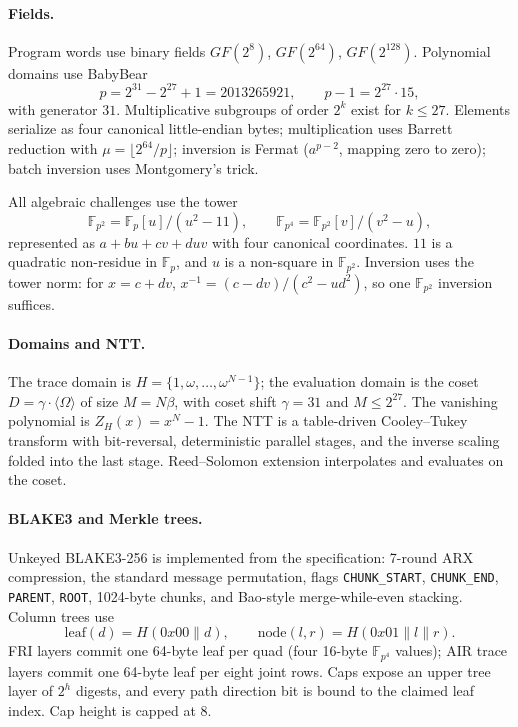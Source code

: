 \documentclass[11pt,a4paper]{article}
\newcommand{\zFp}{\mathbb{F}_p}
\newcommand{\zFpTwo}{\mathbb{F}_{p^2}}
\newcommand{\zFpFour}{\mathbb{F}_{p^4}}
\begin{document}
\paragraph{Fields.} Program words use binary fields $GF(2^8)$,
$GF(2^{64})$, $GF(2^{128})$. Polynomial domains use BabyBear
\[
p = 2^{31}-2^{27}+1 = 2013265921,\qquad p-1 = 2^{27}\cdot 15,
\]
with generator $31$. Multiplicative subgroups of order $2^k$ exist for
$k\le 27$. Elements serialize as four canonical little-endian bytes;
multiplication uses Barrett reduction with
$\mu=\lfloor 2^{64}/p\rfloor$; inversion is Fermat
($a^{p-2}$, mapping zero to zero); batch inversion uses Montgomery's trick.

All algebraic challenges use the tower
\[
\zFpTwo=\zFp[u]/(u^2-11),\qquad
\zFpFour=\zFpTwo[v]/(v^2-u),
\]
represented as $a+bu+cv+duv$ with four canonical coordinates. $11$ is a
quadratic non-residue in $\zFp$, and $u$ is a non-square in $\zFpTwo$. Inversion
uses the tower norm: for $x=c+dv$,
$x^{-1}=(c-dv)/(c^2-ud^2)$, so one $\zFpTwo$ inversion suffices.

\paragraph{Domains and NTT.} The trace domain is
$H=\{1,\omega,\dots,\omega^{N-1}\}$; the evaluation domain is the coset
$D=\gamma\cdot\langle\Omega\rangle$ of size $M=N\beta$, with coset shift
$\gamma=31$ and $M\le 2^{27}$. The vanishing polynomial is
$Z_H(x)=x^N-1$. The NTT is a table-driven Cooley--Tukey transform with
bit-reversal, deterministic parallel stages, and the inverse scaling folded
into the last stage. Reed--Solomon extension interpolates and evaluates on
the coset.

\paragraph{BLAKE3 and Merkle trees.} Unkeyed BLAKE3-256 is implemented from
the specification: 7-round ARX compression, the standard message
permutation, flags \texttt{CHUNK\_START}, \texttt{CHUNK\_END},
\texttt{PARENT}, \texttt{ROOT}, 1024-byte chunks, and Bao-style
merge-while-even stacking. Column trees use
\[
\mathrm{leaf}(d)=H(0x00\|d),\qquad
\mathrm{node}(l,r)=H(0x01\|l\|r).
\]
FRI layers commit one 64-byte leaf per quad (four 16-byte $\zFpFour$ values);
AIR trace layers commit one 64-byte leaf per eight joint rows. Caps expose an
upper tree layer of $2^h$ digests, and every path direction bit is bound to
the claimed leaf index. Cap height is capped at 8.
\end{document}

